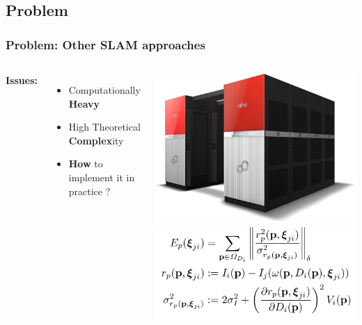 \documentclass[16pt]{beamer}
\begin{document}
\subsection{Problem}
\begin{frame}
  \frametitle{Problem: Other SLAM approaches }
  \begin{columns}
    \textbf{Issues:}
    \begin{itemize}
    \item Computationally \textbf{Heavy}
      \bigskip
    \item High Theoretical \textbf{Complex}ity
      \bigskip
    \item \textbf{How} to implement it in practice ?
    \end{itemize}
    \includegraphics[width=.6\textwidth]{superPc}
    \smallskip
    \includegraphics[width=1\textwidth]{lsdComplex}
  \end{columns}
\end{frame}
\end{document}
